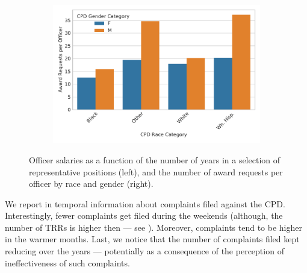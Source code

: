 \begin{figure}[t!] 
\begin{subfigure}{0.43\textwidth}
\end{subfigure}
\begin{subfigure}{0.53\textwidth}
\includegraphics[width=\textwidth]{figs/awards} 
\end{subfigure}
\caption{Officer salaries as a function of the number of years in a selection of representative positions (left),
and the number of award requests per officer by race and gender (right).} \label{fig:salary}
\end{figure}


We report in  temporal information about complaints filed against the CPD. Interestingly, fewer complaints get filed during the weekends (although, the number of TRRs is higher then --- see ). Moreover, complaints tend to be higher in the warmer months. Last, we notice that the number of complaints filed kept reducing over the years --- potentially as a consequence of the perception of ineffectiveness of such complaints.

